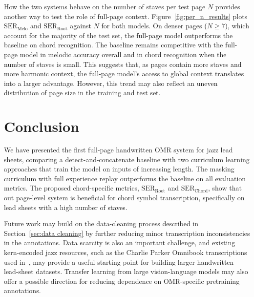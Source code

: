 \documentclass{article}
\begin{document}
How the two systems behave on the number of staves per test page $N$ provides another way to test the role of full-page context. Figure~\ref{fig:per_n_results} plots $\mathrm{SER}_{\mathrm{Melo}}$ and $\mathrm{SER}_{\mathrm{Root}}$ against $N$ for both models. On denser pages ($N\geq 7$), which account for the majority of the test set, the full-page model outperforms the baseline on chord recognition. The baseline remains competitive with the full-page model in melodic accuracy overall and in chord recognition when the number of staves is small. This suggests that, as pages contain more staves and more harmonic context, the full-page model's access to global context translates into a larger advantage. However, this trend may also reflect an uneven distribution of page size in the training and test set.

\section{Conclusion}
We have presented the first full-page handwritten OMR system for jazz lead sheets, comparing a detect-and-concatenate baseline with two curriculum learning approaches that train the model on inputs of increasing length. The masking curriculum with full experience replay outperforms the baseline on all evaluation metrics. The proposed chord-specific metrics, $\mathrm{SER}_{\mathrm{Root}}$ and $\mathrm{SER}_{\mathrm{Chord}}$, show that out page-level system is beneficial for chord symbol transcription, specifically on lead sheets with a high number of staves.

Future work may build on the data-cleaning process described in Section~\ref{sec:data cleaning} by further reducing minor transcription inconsistencies in the annotations. Data scarcity is also an important challenge, and existing kern-encoded jazz resources, such as the Charlie Parker Omnibook transcriptions used in~\cite{baker_idiomaticism_2016}, may provide a useful starting point for building larger handwritten lead-sheet datasets. Transfer learning from large vision-language models may also offer a possible direction for reducing dependence on OMR-specific pretraining annotations.



\end{document}
